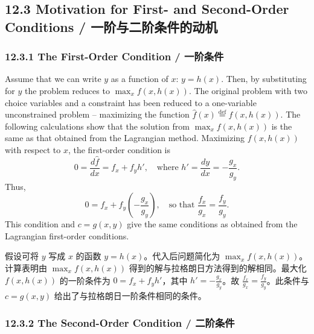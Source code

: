 \subsection{12.3 Motivation for First- and Second-Order Conditions / 一阶与二阶条件的动机}

\subsubsection{12.3.1 The First-Order Condition / 一阶条件}

\begin{original}
Assume that we can write $y$ as a function of $x$: $y = h(x)$. Then, by substituting for $y$ the problem reduces to $\max_x f(x, h(x))$. The original problem with two choice variables and a constraint has been reduced to a one-variable unconstrained problem -- maximizing the function $\hat{f}(x) \stackrel{\text{def}}{=} f(x, h(x))$. The following calculations show that the solution from $\max_x f(x, h(x))$ is the same as that obtained from the Lagrangian method. Maximizing $f(x, h(x))$ with respect to $x$, the first-order condition is
\[
0 = \frac{d\hat{f}}{dx} = f_x + f_y h', \quad \text{where } h' = \frac{dy}{dx} = -\frac{g_x}{g_y}.
\]
Thus,
\[
0 = f_x + f_y\left(-\frac{g_x}{g_y}\right), \quad \text{so that } \frac{f_x}{g_x} = \frac{f_y}{g_y}.
\]
This condition and $c = g(x, y)$ give the same conditions as obtained from the Lagrangian first-order conditions.
\end{original}
\begin{translation}
假设可将 $y$ 写成 $x$ 的函数 $y = h(x)$。代入后问题简化为 $\max_x f(x, h(x))$。计算表明由 $\max_x f(x, h(x))$ 得到的解与拉格朗日方法得到的解相同。最大化 $f(x, h(x))$ 的一阶条件为 $0 = f_x + f_y h'$，其中 $h' = -\frac{g_x}{g_y}$。故 $\frac{f_x}{g_x} = \frac{f_y}{g_y}$。此条件与 $c = g(x, y)$ 给出了与拉格朗日一阶条件相同的条件。
\end{translation}

\subsubsection{12.3.2 The Second-Order Condition / 二阶条件}

